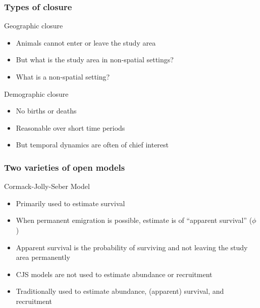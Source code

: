 \documentclass[color=usenames,dvipsnames]{beamer}\usepackage[]{graphicx}\usepackage[]{color}
\begin{document}
\begin{frame}
  \frametitle{Types of closure}
  \large
  Geographic closure
  \begin{itemize}
    \normalsize
    \item Animals cannot enter or leave the study area
    \item But what is the study area in non-spatial settings?
    \item What is a non-spatial setting?
  \end{itemize}
  \pause
  \vfill
  \large
  Demographic closure
  \begin{itemize}
    \normalsize
    \item No births or deaths
    \item Reasonable over short time periods
    \item But temporal dynamics are often of chief interest
  \end{itemize}
\end{frame}





\begin{frame}
  \frametitle{Two varieties of open models}
  \large
  Cormack-Jolly-Seber Model
  \begin{itemize}%
    \normalsize
    \item<1-> Primarily used to estimate survival
    \item<2-> When permanent emigration is possible, estimate is of
      ``apparent survival'' ($\phi$)
    \item<3-> Apparent survival is the probability of
      surviving and not leaving the study area permanently
    \item<4-> CJS models are not used to estimate abundance or recruitment
  \end{itemize}
  \pause
  \vfill
  \large
  \normalsize
  \begin{itemize}
    \item<6-> Traditionally used to estimate abundance, (apparent)
      survival, and recruitment  
  \end{itemize}
  \pause
  \vfill
  \centering %
\end{frame}
\end{document}
